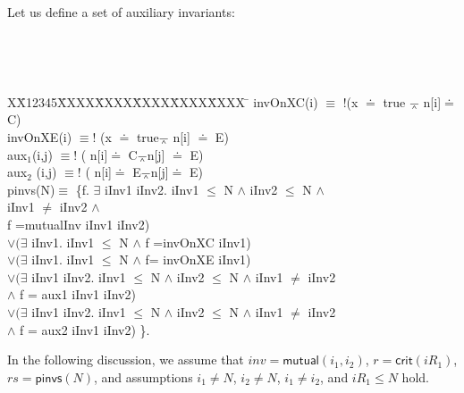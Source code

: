 \documentclass[final]{IEEEtran}
\newlength{\fminilength}
\newenvironment{fmini}[1][\linewidth]
  {\setlength{\fminilength}{#1\fboxsep-2\fboxrule}%
   \vspace{2ex}\noindent\begin{lrbox}{\fminibox}\begin{minipage}{\fminilength}%
   \mbox{ }\hfill\vspace{-2.5ex}}%
  {\end{minipage}\end{lrbox}\vspace{1ex}\hspace{0ex}%
   \framebox{\usebox{\fminibox}}}
\newenvironment{specification}
{\noindent\scriptsize
\tt\begin{fmini}\begin{tabbing}X\=X12345\=XXXX\=XXXX\=XXXX\=XXXX\=XXXX
\=\+\kill} {\end{tabbing}\normalfont\end{fmini}}
\def \eqc {\doteq }
\def \andc {\barwedge }
\def \negc {!}
\def \iInv {iInv}
\begin{document}
\begin{example}\label{example2}
Let us define a set of auxiliary invariants:

\begin{specification}
invOnXC(i)  $\equiv$ $\negc$(x $\doteq$ true $\andc$ n[i]$\doteq$ C)   \\

invOnXE(i)   $\equiv \negc$ (x $\doteq$ true$\andc$ n[i] $\doteq$ E)  \\


aux$_1$(i,j)   $\equiv \negc$ ( n[i]$\doteq$ C$\andc$n[j] $\doteq$ E)  \\

aux$_2$ (i,j) $\equiv \negc$  ( n[i]$\doteq$ E$\andc$n[j]$\doteq$ E)\\

  pinvs(N)$\equiv$ \{f. $\exists$ \iInv1 \iInv2. \iInv1 $\le$ N $\wedge$ \iInv2 $\le$ N $\wedge$\\
   \iInv1 $\ne$ \iInv2 $\wedge$   \\
   f =mutualInv   \iInv1 \iInv2) \\
 $ \vee(\exists$ \iInv1. \iInv1 $\le$ N $\wedge$  f =invOnXC  \iInv1)   \\
$\vee(\exists$ \iInv1. \iInv1 $\le$ N $\wedge$  f= invOnXE \iInv1)    \\
$\vee(\exists$ \iInv1 \iInv2. \iInv1 $\le$ N $\wedge$ \iInv2 $\le$ N $\wedge$ \iInv1 $\ne$ \iInv2 \\
$\wedge$ f =  aux1  \iInv1 \iInv2) \\
$\vee(\exists$ \iInv1 \iInv2. \iInv1 $\le$ N $\wedge$ \iInv2 $\le$ N $\wedge$ \iInv1 $\ne$ \iInv2 \\
$\wedge$ f =  aux2  \iInv1 \iInv2) \}.

\end{specification}

In the following discussion, we assume that $inv=\mathsf{mutual} (i_1,i_2)$, $r=\mathsf{crit}(iR_1)$, $rs= \mathsf{pinvs} (N)$, and  assumptions  $i_1 \neq N$, $i_2 \neq N$, $i_1 \neq i_2$, and $iR_1 \leq N$ hold.

\begin{itemize}



\end{itemize}
\end{example}
\end{document}

